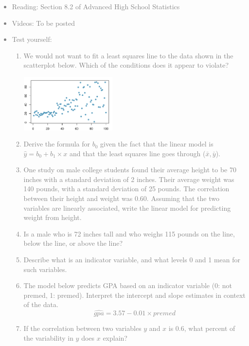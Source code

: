 \documentclass[11pt]{article}
\newcommand{\gray}[1]{\textcolor{gray}{#1}}
\begin{document}
\gray{
{\it
\vspace{-0.55cm}
\begin{itemize}
\renewcommand{\labelitemi}{{\textcolor{dark}{$\ast$}}}
\item Reading: Section 8.2 of Advanced High School Statistics
\item Videos: To be posted
\item Test yourself:
\begin{enumerate}
\item We would not want to fit a least squares line to the data shown in the scatterplot below. Which of the conditions does it appear to violate?
\begin{center}
\includegraphics[width=0.4\textwidth]{figures/nonconstant_var}
\end{center}
\item Derive the formula for $b_0$ given the fact that the linear model is $\hat{y} = b_0 + b_1 \times x$ and that the least squares line goes through ($\bar{x}, \bar{y}$).
\item One study on male college students found their average height to be 70 inches with a standard deviation of 2 inches. Their average weight was 140 pounds, with a standard deviation of 25 pounds. The correlation between their height and weight was 0.60. Assuming that the two variables are linearly associated, write the linear model for predicting weight from height.
\item Is a male who is 72 inches tall and who weighs 115 pounds on the line, below the line, or above the line?
\item Describe what is an indicator variable, and what levels 0 and 1 mean for such variables.
\item The model below predicts GPA based on an indicator variable (0: not premed, 1: premed). Interpret the intercept and slope estimates in context of the data.
\[ \widehat{gpa} = 3.57 - 0.01 \times premed \]
\item If the correlation between two variables $y$ and $x$ is 0.6, what percent of the variability in $y$ does $x$ explain? 
\end{enumerate}
\end{itemize}
}}
\end{document}
